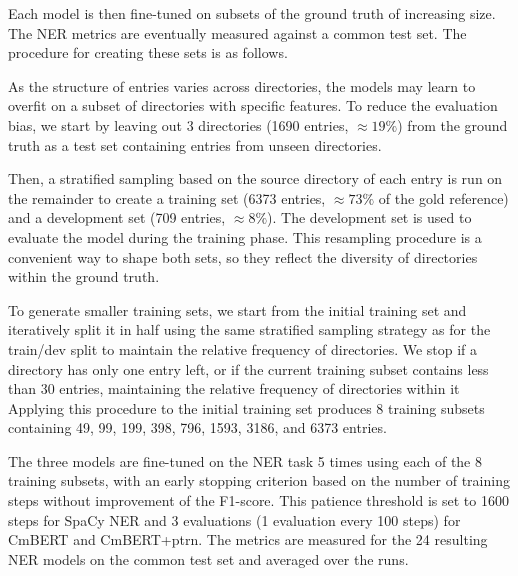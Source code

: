 Each model is then fine-tuned on subsets of the ground truth of increasing size.
The NER metrics are eventually measured against a common test set.
The procedure for creating these sets is as follows. 

As the structure of entries varies across directories, the models may learn to overfit on a subset of directories with specific features. 
To reduce the evaluation bias, we start by leaving out 3 directories (1690 entries, $\approx 19\%$) from the ground truth as a test set containing entries from unseen directories.

Then, a stratified sampling based on the source directory of each entry is run on the remainder to create a training set (6373 entries, $\approx 73\%$ of the gold reference) and a development set (709 entries, $\approx 8\%$).
The development set is used to evaluate the model during the training phase.
This resampling procedure is a convenient way to shape both sets, so they reflect the diversity of directories within the ground truth.

To generate smaller training sets, we start from the initial training set and iteratively split it in half using the same stratified sampling strategy as for the train/dev split to maintain the relative frequency of directories. 
We stop if a directory has only one entry left, or if the current training subset contains less than 30 entries, maintaining the relative frequency of directories within it
Applying this procedure to the initial training set produces 8 training subsets containing 49, 99, 199, 398, 796, 1593, 3186, and 6373 entries.

The three models are fine-tuned on the NER task 5 times using each of the 8 training subsets, with an early stopping criterion based on the number of training steps without improvement of the F1-score. 
This patience threshold is set to 1600 steps for SpaCy NER and 3 evaluations (1 evaluation every 100 steps) for CmBERT and CmBERT+ptrn.
The metrics are measured for the 24 resulting NER models on the common test set and averaged over the runs.





